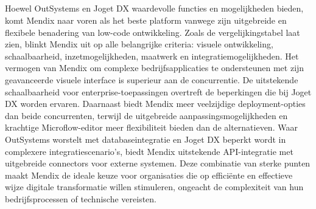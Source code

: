 \subsection{}
Hoewel OutSystems en Joget DX waardevolle functies en mogelijkheden bieden, komt Mendix naar voren als het beste platform vanwege zijn uitgebreide en flexibele benadering van low-code ontwikkeling. Zoals de vergelijkingstabel laat zien, blinkt Mendix uit op alle belangrijke criteria: visuele ontwikkeling, schaalbaarheid, inzetmogelijkheden, maatwerk en integratiemogelijkheden.
Het vermogen van Mendix om complexe bedrijfsapplicaties te ondersteunen met zijn geavanceerde visuele interface is superieur aan de concurrentie. De uitstekende schaalbaarheid voor enterprise-toepassingen overtreft de beperkingen die bij Joget DX worden ervaren. Daarnaast biedt Mendix meer veelzijdige deployment-opties dan beide concurrenten, terwijl de uitgebreide aanpassingsmogelijkheden en krachtige Microflow-editor meer flexibiliteit bieden dan de alternatieven.
Waar OutSystems worstelt met databaseintegratie en Joget DX beperkt wordt in complexere integratiescenario's, biedt Mendix uitstekende \gls{API}-integratie met uitgebreide connectors voor externe systemen. Deze combinatie van sterke punten maakt Mendix de ideale keuze voor organisaties die op efficiënte en effectieve wijze digitale transformatie willen stimuleren, ongeacht de complexiteit van hun bedrijfsprocessen of technische vereisten.


